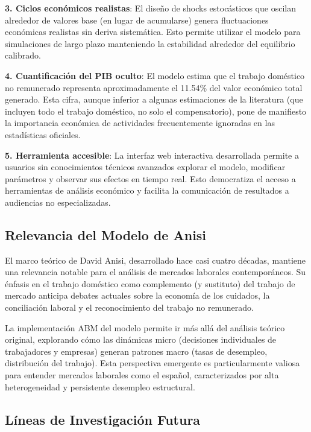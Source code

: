 \textbf{3. Ciclos económicos realistas}: El diseño de shocks estocásticos que oscilan alrededor de valores base (en lugar de acumularse) genera fluctuaciones económicas realistas sin deriva sistemática. Esto permite utilizar el modelo para simulaciones de largo plazo manteniendo la estabilidad alrededor del equilibrio calibrado.

\textbf{4. Cuantificación del PIB oculto}: El modelo estima que el trabajo doméstico no remunerado representa aproximadamente el 11.54\% del valor económico total generado. Esta cifra, aunque inferior a algunas estimaciones de la literatura (que incluyen todo el trabajo doméstico, no solo el compensatorio), pone de manifiesto la importancia económica de actividades frecuentemente ignoradas en las estadísticas oficiales.

\textbf{5. Herramienta accesible}: La interfaz web interactiva desarrollada permite a usuarios sin conocimientos técnicos avanzados explorar el modelo, modificar parámetros y observar sus efectos en tiempo real. Esto democratiza el acceso a herramientas de análisis económico y facilita la comunicación de resultados a audiencias no especializadas.

\subsection{Relevancia del Modelo de Anisi}

El marco teórico de David Anisi, desarrollado hace casi cuatro décadas, mantiene una relevancia notable para el análisis de mercados laborales contemporáneos. Su énfasis en el trabajo doméstico como complemento (y sustituto) del trabajo de mercado anticipa debates actuales sobre la economía de los cuidados, la conciliación laboral y el reconocimiento del trabajo no remunerado.

La implementación ABM del modelo permite ir más allá del análisis teórico original, explorando cómo las dinámicas micro (decisiones individuales de trabajadores y empresas) generan patrones macro (tasas de desempleo, distribución del trabajo). Esta perspectiva emergente es particularmente valiosa para entender mercados laborales como el español, caracterizados por alta heterogeneidad y persistente desempleo estructural.

\subsection{Líneas de Investigación Futura}

